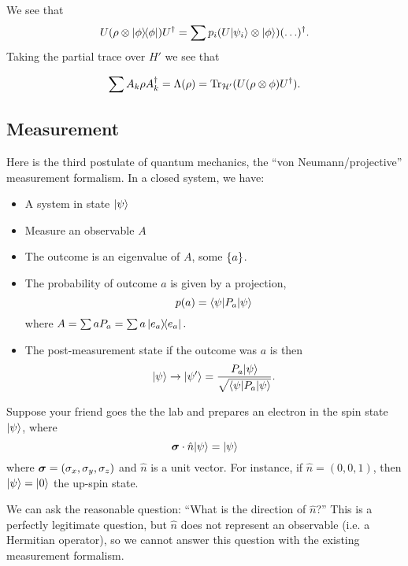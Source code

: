 We see that
\begin{equation}
    U(\rho\otimes \left\lvert \phi \middle\rangle\!\middle\langle \phi \right\rvert)U^\dagger =\sum p_i (U\lvert\psi_i\rangle\otimes \lvert\phi\rangle)(\ldots)^\dagger.
\end{equation}
Taking the partial trace over $H'$ we see that 

\begin{equation}
    \sum A_k \rho A_k^\dagger =\Lambda(\rho)=\operatorname{Tr}_{\mathcal H'}(U(\rho\otimes \phi)U^\dagger).
\end{equation}

\subsection*{Measurement}
Here is the third postulate of quantum mechanics, the ``von Neumann/projective'' measurement formalism. In a closed system, we have:
\begin{itemize}
    \item A system in state $\lvert\psi\rangle$
    \item Measure an observable $A$
    \item The outcome is an eigenvalue of $A$, some $\{a\}$.
    \item The probability of outcome $a$ is given by a projection,
    \begin{equation}
        p(a)=\langle\psi\rvert P_a \lvert\psi\rangle
    \end{equation}
    where $A=\sum a P_a = \sum a \left\lvert e_a \middle\rangle\!\middle\langle e_a \right\rvert.$
    \item The post-measurement state if the outcome was $a$ is then
    \begin{equation}
        \lvert\psi\rangle\to \lvert\psi'\rangle=\frac{P_a \lvert\psi\rangle}{\sqrt{\langle\psi\rvert P_a \lvert\psi\rangle}}.
    \end{equation}
\end{itemize}
\begin{exm}
    Suppose your friend goes the the lab and prepares an electron in the spin state $\lvert\psi\rangle$, where
    \begin{equation}
        \mbox{\boldmath$ \sigma $} \cdot \hat n \lvert\psi\rangle=\lvert\psi\rangle
    \end{equation}
    where $\mbox{\boldmath$ \sigma $} =(\sigma_x,\sigma_y,\sigma_z)$ and $\hat n$ is a unit vector.
    For instance, if $\hat n=(0,0,1)$, then $\lvert\psi\rangle=\lvert0\rangle$ the up-spin state.
    
    We can ask the reasonable question: ``What is the direction of $\hat n$?'' This is a perfectly legitimate question, but $\hat n$ does not represent an observable (i.e. a Hermitian operator), so we cannot answer this question with the existing measurement formalism.
\end{exm}

